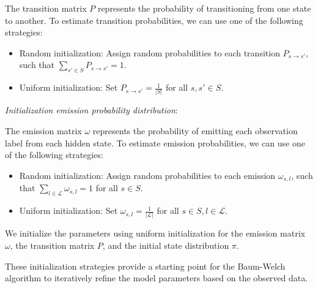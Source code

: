 The transition matrix $P$ represents the probability of transitioning from one state to another.
To estimate transition probabilities, we can use one of the following strategies:
\begin{itemize}
    \item Random initialization: Assign random probabilities to each transition $P_{s \rightarrow s'}$, such that $\sum_{s' \in S} P_{s \rightarrow s'} = 1$.
    \item Uniform initialization: Set $P_{s \rightarrow s'} = \frac{1}{|S|}$ for all $s, s' \in S$.
\end{itemize}

\textit{Initialization emission probability distribution}:

The emission matrix $\omega$ represents the probability of emitting each observation label from each hidden state.
To estimate emission probabilities, we can use one of the following strategies:
\begin{itemize}
    \item Random initialization: Assign random probabilities to each emission $\omega_{s, l}$, such that $\sum_{l \in \mathcal{L}} \omega_{s, l} = 1$ for all $s \in S$.
    \item Uniform initialization: Set $\omega_{s, l} = \frac{1}{|\mathcal{L}|}$ for all $s \in S, l \in \mathcal{L}$.
\end{itemize}

We initialize the parameters using uniform initialization for the emission matrix $\omega$, the transition matrix $P$, and the initial state distribution $\pi$.

These initialization strategies provide a starting point for the Baum-Welch algorithm to iteratively refine the model parameters based on the observed data.

